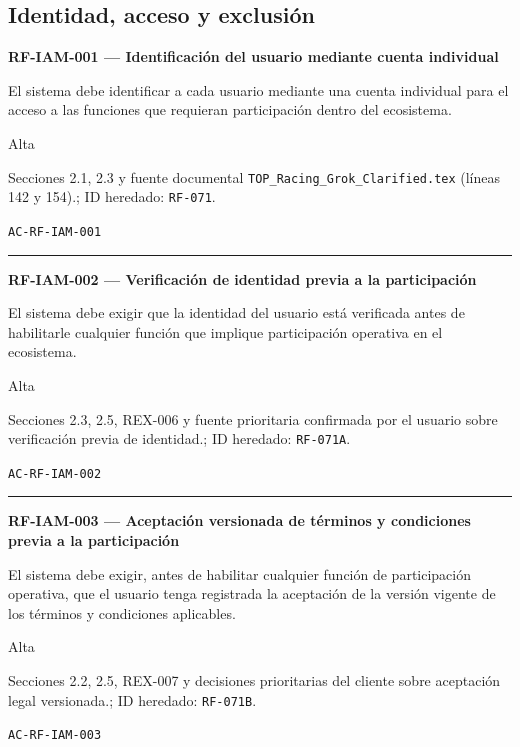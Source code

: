 \documentclass[10pt,letterpaper]{article}
\begin{document}
\subsection{Identidad, acceso y exclusión}
\noindent\textbf{RF-IAM-001 --- Identificación del usuario mediante cuenta individual}\par
\begin{description}[style=nextline,leftmargin=3.15cm,labelwidth=2.8cm,font=\normalfont\bfseries]
\item[Obligación] El sistema debe identificar a cada usuario mediante una cuenta individual para el acceso a las funciones que requieran participación dentro del ecosistema.
\item[Prioridad] Alta
\item[Procedencia] Secciones 2.1, 2.3 y fuente documental \texttt{TOP\_Racing\_Grok\_Clarified.tex} (líneas 142 y 154).; ID heredado: \texttt{RF-071}.
\item[Verificación] \texttt{AC-RF-IAM-001}
\end{description}
\vspace{0.25em}\hrule\vspace{0.65em}
\noindent\textbf{RF-IAM-002 --- Verificación de identidad previa a la participación}\par
\begin{description}[style=nextline,leftmargin=3.15cm,labelwidth=2.8cm,font=\normalfont\bfseries]
\item[Obligación] El sistema debe exigir que la identidad del usuario está verificada antes de habilitarle cualquier función que implique participación operativa en el ecosistema.
\item[Prioridad] Alta
\item[Procedencia] Secciones 2.3, 2.5, REX-006 y fuente prioritaria confirmada por el usuario sobre verificación previa de identidad.; ID heredado: \texttt{RF-071A}.
\item[Verificación] \texttt{AC-RF-IAM-002}
\end{description}
\vspace{0.25em}\hrule\vspace{0.65em}
\noindent\textbf{RF-IAM-003 --- Aceptación versionada de términos y condiciones previa a la participación}\par
\begin{description}[style=nextline,leftmargin=3.15cm,labelwidth=2.8cm,font=\normalfont\bfseries]
\item[Obligación] El sistema debe exigir, antes de habilitar cualquier función de participación operativa, que el usuario tenga registrada la aceptación de la versión vigente de los términos y condiciones aplicables.
\item[Prioridad] Alta
\item[Procedencia] Secciones 2.2, 2.5, REX-007 y decisiones prioritarias del cliente sobre aceptación legal versionada.; ID heredado: \texttt{RF-071B}.
\item[Verificación] \texttt{AC-RF-IAM-003}
\end{description}
\end{document}
